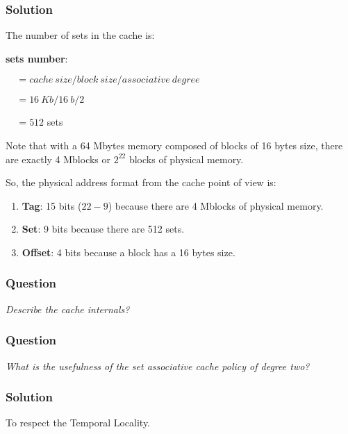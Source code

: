 \begin{frame}
  \frametitle{Solution}

  The number of sets in the cache is:

  \nl

  \textbf{sets number}:

  $~~~~~= cache~size / block~size / associative~degree$

  $~~~~~= 16~Kb / 16~b / 2$

  $~~~~~= 512$ sets

  \nl

  Note that with a 64 Mbytes memory composed of blocks of 16 bytes size,
  there are exactly 4 Mblocks or $2^{22}$ blocks of physical memory.

  \nl

  So, the physical address format from the cache point of view is:

  \begin{enumerate}
    \item
      \textbf{Tag}: 15 bits ($22 - 9$) because there are 4 Mblocks of
      physical memory.
    \item
      \textbf{Set}: 9 bits because there are 512 sets.
    \item
      \textbf{Offset}: 4 bits because a block has a 16 bytes size.
  \end{enumerate}
\end{frame}


\begin{frame}
  \frametitle{Question}

  \textit{Describe the cache internals?}
\end{frame}


\begin{frame}
  \frametitle{Question}

  \textit{What is the usefulness of the set associative cache policy
    of degree two?}
\end{frame}


\begin{frame}
  \frametitle{Solution}

  To respect the Temporal Locality.
\end{frame}


